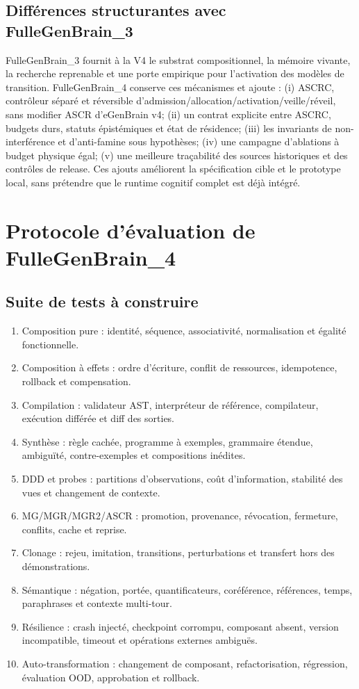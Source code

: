 \documentclass[11pt,a4paper]{article}
\begin{document}
\subsection{Différences structurantes avec FulleGenBrain\_3}
FulleGenBrain\_3 fournit à la V4 le substrat compositionnel, la mémoire vivante, la recherche reprenable et une porte empirique pour l'activation des modèles de transition. FulleGenBrain\_4 conserve ces mécanismes et ajoute : (i) ASCRC, contrôleur séparé et réversible d'admission/allocation/activation/veille/réveil, sans modifier ASCR d'eGenBrain v4; (ii) un contrat explicite entre ASCRC, budgets durs, statuts épistémiques et état de résidence; (iii) les invariants de non-interférence et d'anti-famine sous hypothèses; (iv) une campagne d'ablations à budget physique égal; (v) une meilleure traçabilité des sources historiques et des contrôles de release. Ces ajouts améliorent la spécification cible et le prototype local, sans prétendre que le runtime cognitif complet est déjà intégré.

\section{Protocole d'évaluation de FulleGenBrain\_4}
\subsection{Suite de tests à construire}
\begin{enumerate}
\item Composition pure : identité, séquence, associativité, normalisation et égalité fonctionnelle.
\item Composition à effets : ordre d'écriture, conflit de ressources, idempotence, rollback et compensation.
\item Compilation : validateur AST, interpréteur de référence, compilateur, exécution différée et diff des sorties.
\item Synthèse : règle cachée, programme à exemples, grammaire étendue, ambiguïté, contre-exemples et compositions inédites.
\item DDD et probes : partitions d'observations, coût d'information, stabilité des vues et changement de contexte.
\item MG/MGR/MGR2/ASCR : promotion, provenance, révocation, fermeture, conflits, cache et reprise.
\item Clonage : rejeu, imitation, transitions, perturbations et transfert hors des démonstrations.
\item Sémantique : négation, portée, quantificateurs, coréférence, références, temps, paraphrases et contexte multi-tour.
\item Résilience : crash injecté, checkpoint corrompu, composant absent, version incompatible, timeout et opérations externes ambiguës.
\item Auto-transformation : changement de composant, refactorisation, régression, évaluation OOD, approbation et rollback.
\end{enumerate}
\end{document}
